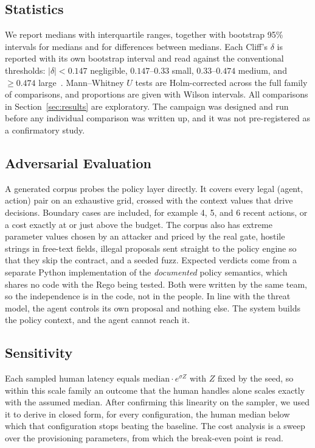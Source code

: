 \subsection{Statistics}
We report medians with interquartile ranges, together with bootstrap 95\% intervals for medians and
for differences between medians. Each Cliff's $\delta$ is reported with its own bootstrap interval and
read against the conventional thresholds: $|\delta|<0.147$ negligible, $0.147$--$0.33$ small,
$0.33$--$0.474$ medium, and $\geq 0.474$ large~\cite{cliff1993}. Mann--Whitney $U$ tests are
Holm-corrected across the full family of comparisons, and proportions are given with Wilson
intervals. All comparisons in Section~\ref{sec:results} are exploratory. The campaign was designed and
run before any individual comparison was written up, and it was not pre-registered as a confirmatory
study.

\subsection{Adversarial Evaluation}
A generated corpus probes the policy layer directly. It covers every legal (agent, action) pair on an
exhaustive grid, crossed with the context values that drive decisions. Boundary cases are included,
for example 4, 5, and 6 recent actions, or a cost exactly at or just above the budget. The corpus also
has extreme parameter values chosen by an attacker and priced by the real gate, hostile strings in
free-text fields, illegal proposals sent straight to the policy engine so that they skip the
contract, and a seeded fuzz. Expected verdicts come from a separate Python implementation of the
\emph{documented} policy semantics, which shares no code with the Rego being tested. Both were written
by the same team, so the independence is in the code, not in the people. In line with the threat
model, the agent controls its own proposal and nothing else. The system builds the policy context, and
the agent cannot reach it.

\subsection{Sensitivity}
Each sampled human latency equals $\mathrm{median}\cdot e^{\sigma Z}$ with $Z$ fixed by the seed,
so within this scale family an outcome that the human handles alone scales exactly with the assumed
median. After confirming this linearity on the sampler, we used it to derive in closed form, for every
configuration, the human median below which that configuration stops beating the baseline. The cost
analysis is a sweep over the provisioning parameters, from which the break-even point is read.
